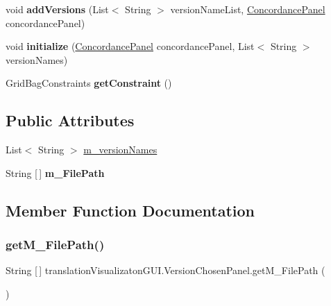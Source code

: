 \begin{DoxyCompactItemize}
void {\bfseries add\+Versions} (List$<$ String $>$ version\+Name\+List, \hyperlink{classtranslation_visualizaton_g_u_i_1_1_concordance_panel}{Concordance\+Panel} concordance\+Panel)
\item 
\mbox{\label{classtranslation_visualizaton_g_u_i_1_1_version_chosen_panel_a7622fd698b62bba1108d63b193a6e024}} 
void {\bfseries initialize} (\hyperlink{classtranslation_visualizaton_g_u_i_1_1_concordance_panel}{Concordance\+Panel} concordance\+Panel, List$<$ String $>$ version\+Names)
\item 
\mbox{\label{classtranslation_visualizaton_g_u_i_1_1_version_chosen_panel_a0225922f91d4b05d7bec64921df05e07}} 
Grid\+Bag\+Constraints {\bfseries get\+Constraint} ()
\end{DoxyCompactItemize}
\subsection*{Public Attributes}
\begin{DoxyCompactItemize}
\item 
List$<$ String $>$ \hyperlink{classtranslation_visualizaton_g_u_i_1_1_version_chosen_panel_a886df3a3c3c1d8bd15320d84972fa518}{m\+\_\+version\+Names}
\item 
String \mbox{[}$\,$\mbox{]} {\bfseries m\+\_\+\+File\+Path}
\end{DoxyCompactItemize}


\subsection{Member Function Documentation}
\mbox{\label{classtranslation_visualizaton_g_u_i_1_1_version_chosen_panel_a8b960328c36ce36d4817837bd0843f9c}} 
\subsubsection{\texorpdfstring{get\+M\+\_\+\+File\+Path()}{getM\_FilePath()}}
{\footnotesize\ttfamily String \mbox{[}$\,$\mbox{]} translation\+Visualizaton\+G\+U\+I.\+Version\+Chosen\+Panel.\+get\+M\+\_\+\+File\+Path (\begin{DoxyParamCaption}{ }\end{DoxyParamCaption})\hspace{0.3cm}{\ttfamily [inline]}}


